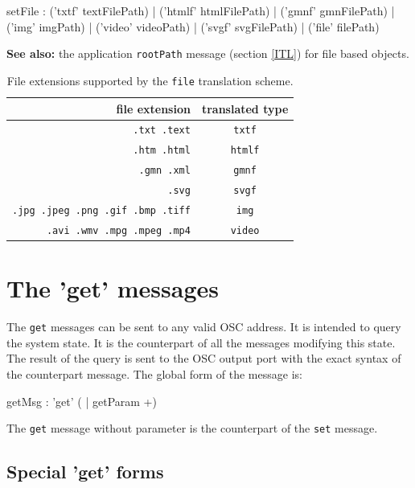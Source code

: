 \documentclass[a4paper,twoside]{report}
\newcommand{\toplevel}[1]	{\chapter{#1}}
\newcommand{\sublevel}[1]	{\section{#1}}
\newcommand{\OSC}[1]		{\texttt{#1}}
\renewcommand{\seealso}	{\textbf{See also: }}
\begin{document}
\label{setfile}
\begin{rail}
setFile : 
	('txtf' textFilePath) |
	('htmlf' htmlFilePath) |
	('gmnf' gmnFilePath) |
	('img' imgPath) |
	('video' videoPath) |
	('svgf' svgFilePath) |
	('file' filePath)
\end{rail}

\seealso the application \OSC{rootPath} message (section \ref{ITL}) for file based objects.

\begin{table}[htdp]
\caption{File extensions supported by the \OSC{file} translation scheme.}
\begin{center}
\begin{tabular}{|r|c|}
\hline
file extension & translated type \\
\hline
\OSC{.txt .text}		& \OSC{txtf} \\
\OSC{.htm .html}		& \OSC{htmlf} \\
\OSC{.gmn .xml}		& \OSC{gmnf} \\
\OSC{.svg} 			& \OSC{svgf} \\
\OSC{.jpg .jpeg .png .gif .bmp .tiff} & \OSC{img} \\
\OSC{.avi .wmv .mpg .mpeg .mp4} & \OSC{video} \\
\hline
\end{tabular}
\end{center}
\label{fileTranslate}
\end{table}


\toplevel{The 'get' messages}
\label{getsect}

The \OSC{get} messages can be sent to any valid OSC address. It is intended to query the system state. It is the counterpart of all the messages modifying this state.  The result of the query is sent to the OSC output port with the exact syntax of the counterpart message. 
The global form of the message is:
\begin{rail}
getMsg : 'get' ( | getParam +)
\end{rail}

The \OSC{get} message without parameter is the counterpart of the \OSC{set} message. 

\sublevel{Special 'get' forms}
\end{document}
